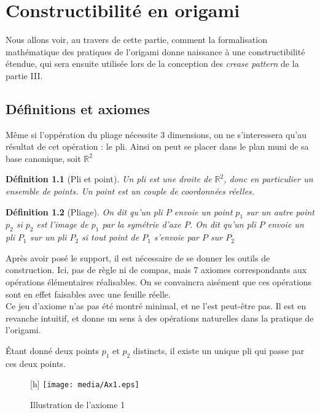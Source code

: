 \documentclass[a4paper,12pt,french,draft]{report}
\newtheorem{definition}{Définition}[section]
\begin{document}
		
		

\chapter{Constructibilité en origami}
	Nous allons voir, au travers de cette partie, comment la formalisation mathématique des pratiques de l'origami donne naissance à une constructibilité étendue, qui sera ensuite utilisée lors de la conception des \emph{crease pattern} de la partie III.
	
	\section{Définitions et axiomes}
		Même si l'oppération du pliage nécessite 3 dimensions, on ne s'interessera qu'au résultat de cet opération : le pli. Ainsi on peut se placer dans le plan muni de sa base canonique, soit $\mathbb{R}^{2}$
		\begin{definition}[Pli et point]
			Un \emph{pli} est une droite de $\mathbb{R}^{2}$, donc en particulier un ensemble de points. Un \emph{point} est un couple de coordonnées réelles.
		\end{definition}
		\begin{definition}[Pliage]
			On dit qu'un pli $P$ \emph{envoie} un point $p_{1}$ sur un autre point $p_{2}$ si $p_{2}$ est l'image de $p_{1}$ par la symétrie d'axe $P$. On dit qu'un pli $P$ \emph{envoie} un pli $P_{1}$ sur un pli $P_{2}$ si tout point de $P_{1}$ s'envoie par $P$ sur $P_{2}$
		\end{definition}
		Après avoir posé le support, il est nécessaire de se donner les outils de construction. Ici, pas de règle ni de compas, mais 7 axiomes correspondants aux opérations élémentaires réalisables. On se convaincra aisément que ces opérations sont en effet faisables avec une feuille réelle. \\
		Ce jeu d'axiome n'as pas été montré minimal, et ne l'est peut-être pas. Il est en revanche intuitif, et donne un sens à des opérations naturelles dans la pratique de l'origami. 
		\begin{axiome}
			Étant donné deux points $p_{1}$ et $p_{2}$ distincts, il existe un unique pli qui passe par ces deux points.
		\end{axiome}
		
		\begin{figure}
		    \begin{center}[h]
			\texttt{[image: media/Ax1.eps]}
		    \end{center}
			\caption{Illustration de l'axiome 1}
		\end{figure}
		
\end{document}
